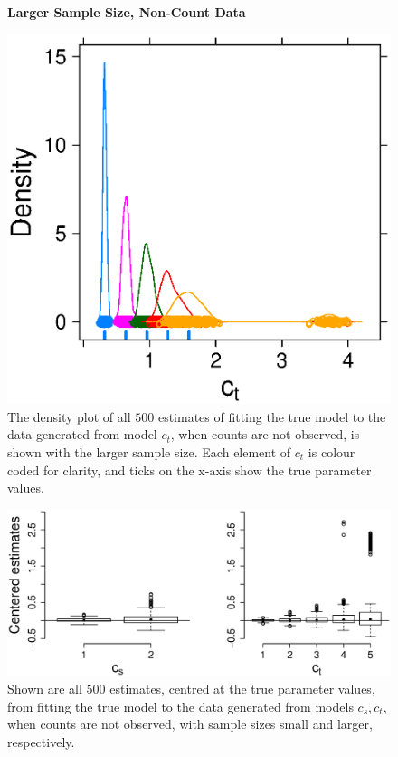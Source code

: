 \documentclass[smallextended]{svjour3}
\begin{document}
\begin{figure}
  \textbf{Larger Sample Size, Non-Count Data}\par
  \centering
  \includegraphics[scale=0.75]{largerEM}
  \caption{The density plot of all $500$ estimates of fitting the true model to the data generated from model $c_t$, when counts are not observed, is shown with the larger sample size.  Each element of $c_t$ is colour coded for clarity, and ticks on the x-axis show the true parameter values.}
  \label{fig:largerEM}
\end{figure}

\begin{figure}
  \centering
  \includegraphics[scale=0.5]{em_bp}
  \caption{Shown are all $500$ estimates, centred at the true parameter values, from fitting the true model to the data generated from models $c_s,c_t$, when counts are not observed, with sample sizes small and larger, respectively.}
  \label{fig:em_bp}
\end{figure}
\end{document}
